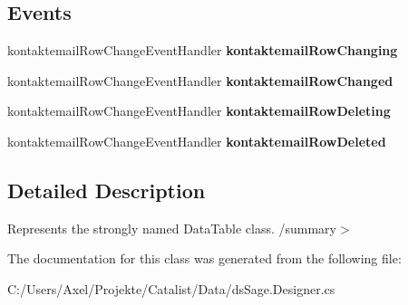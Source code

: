 \subsection*{Events}
\begin{DoxyCompactItemize}
\item 
kontaktemail\+Row\+Change\+Event\+Handler {\bfseries kontaktemail\+Row\+Changing}\hypertarget{class_products_1_1_data_1_1ds_sage_1_1kontaktemail_data_table_acda09494a8a8f7c7b9404b042dd4090b}{}\label{class_products_1_1_data_1_1ds_sage_1_1kontaktemail_data_table_acda09494a8a8f7c7b9404b042dd4090b}

\item 
kontaktemail\+Row\+Change\+Event\+Handler {\bfseries kontaktemail\+Row\+Changed}\hypertarget{class_products_1_1_data_1_1ds_sage_1_1kontaktemail_data_table_a7162d7467219b1f2833b178eba794404}{}\label{class_products_1_1_data_1_1ds_sage_1_1kontaktemail_data_table_a7162d7467219b1f2833b178eba794404}

\item 
kontaktemail\+Row\+Change\+Event\+Handler {\bfseries kontaktemail\+Row\+Deleting}\hypertarget{class_products_1_1_data_1_1ds_sage_1_1kontaktemail_data_table_ab23b7465f819fa9d35e5e492543701ce}{}\label{class_products_1_1_data_1_1ds_sage_1_1kontaktemail_data_table_ab23b7465f819fa9d35e5e492543701ce}

\item 
kontaktemail\+Row\+Change\+Event\+Handler {\bfseries kontaktemail\+Row\+Deleted}\hypertarget{class_products_1_1_data_1_1ds_sage_1_1kontaktemail_data_table_ab298d35269170f8ab5d8f353a8d90757}{}\label{class_products_1_1_data_1_1ds_sage_1_1kontaktemail_data_table_ab298d35269170f8ab5d8f353a8d90757}

\end{DoxyCompactItemize}


\subsection{Detailed Description}
Represents the strongly named Data\+Table class. /summary$>$ 

The documentation for this class was generated from the following file\+:\begin{DoxyCompactItemize}
\item 
C\+:/\+Users/\+Axel/\+Projekte/\+Catalist/\+Data/ds\+Sage.\+Designer.\+cs\end{DoxyCompactItemize}
